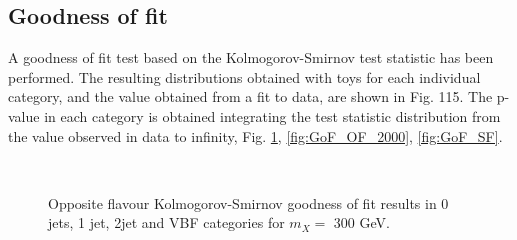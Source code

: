 \newpage
\subsection{Goodness of fit}
A goodness of fit test based on the Kolmogorov-Smirnov test statistic has been performed. The
resulting distributions obtained with toys for each individual category, and the value obtained
from a fit to data, are shown in Fig. 115. The p-value in each category is obtained integrating
the test statistic distribution from the value observed in data to infinity, Fig. \ref{fig:GoF_OF_300}, \ref{fig:GoF_OF_2000}, \ref{fig:GoF_SF}. 

\begin{figure}[htb]
\centering
{}
\\

\caption{Opposite flavour Kolmogorov-Smirnov goodness of fit results in 0 jets, 1 jet, 2jet and VBF categories for $m_X=$ 300 GeV.}
    \label{fig:GoF_OF_300}
\end{figure}

